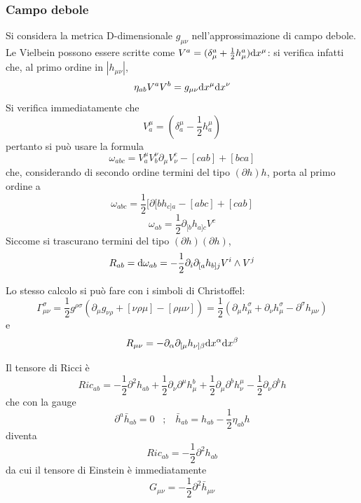 \subsubsection{Campo debole}
Si considera la metrica D-dimensionale $g_{\mu\nu}$ nell'approssimazione di campo debole.
Le Vielbein possono essere scritte come \( V^a = (\delta^a_\mu + \frac{1}{2} h^a_\mu) \mathrm{d} x^\mu \): si verifica infatti che, al primo ordine in $|h_{\mu\nu}|$, 
\[ \eta_{ab} V^aV^b = g_{\mu\nu}\mathrm{d} x^\mu \mathrm{d} x^\nu \]
Si verifica immediatamente che 
\[ V^\mu_a = (\delta^\mu_a - \frac{1}{2} h^\mu_a) \]
pertanto si pu\`o usare la formula
\[ \omega_{abc} = V^\mu_a V^\nu_b \partial_\mu V^c_\nu - [cab] + [bca] \]
che, considerando di secondo ordine termini del tipo $(\partial h)h$, porta al primo ordine a 
\[ \omega_{abc} = \frac{1}{2} [ \partial{[b} h_{c]a} - [abc] + [cab] \]
\[ \omega_{ab} = \frac{1}{2} \partial_{[b} h_{a]c} V^c \]
Siccome si trascurano termini del tipo $(\partial h)(\partial h)$,
\[ R_{ab} = \mathrm{d} \omega_{ab} = -\frac{1}{2} \partial_i \partial_{[a} h_{b]j} V^i \wedge V^j \]

Lo stesso calcolo si pu\`o fare con i simboli di Christoffel:
\[ \Gamma ^\sigma_{\mu\nu} = \frac{1}{2} g^{\rho\sigma}(\partial_\mu g_{\nu\rho} + [\nu\rho\mu] - [\rho\mu\nu]) = \frac{1}{2}(\partial_\mu h^\sigma_\mu + \partial_\nu h^\sigma_\mu - \partial^\sigma h_{\mu\nu} ) \]
e
\[ R_{\mu\nu} = -\partial_{\alpha} \partial_{[\mu} h_{\nu]\beta} \mathrm{d} x^\alpha \mathrm{d} x^\beta \]

Il tensore di Ricci \`e
\[ Ric_{ab} = - \frac{1}{2} \partial^2  h_{ab} + \frac{1}{2} \partial_\nu \partial^\mu h^b_\mu 
              + \frac{1}{2} \partial_\mu \partial^b h^\mu_\nu - \frac{1}{2} \partial_\nu \partial^b h  \]
che con la gauge 
\[ \partial^a \bar{h}_{ab} = 0  \;\;\; ; \;\;\; \bar{h}_{ab} = h_{ab} - \frac{1}{2} \eta_{ab} h \]
diventa
\[ Ric_{ab} = - \frac{1}{2} \partial^2  h_{ab} \]
da cui il tensore di Einstein \`e immediatamente
\[ G_{\mu\nu} = -\frac{1}{2} \partial^2 \bar{h}_{\mu\nu} \]

